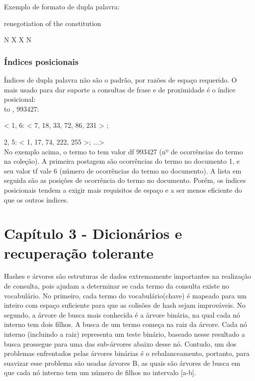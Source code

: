 Exemplo de formato de dupla palavra:

renegotiation of the constitution

N X X N

\subsubsection{Índices posicionais}

Índices de dupla palavra não são o padrão, por razões de espaço requerido. O mais usado para dar suporte a consultas de frase e de proximidade é o índice posicional: \\

to , 993427:

< 1, 6: < 7, 18, 33, 72, 86, 231 > ;

\hspace{0.4cm}2, 5: < 1, 17, 74, 222, 255 >; ...>\\

No exemplo acima, o termo to tem valor df 993427 (nº de ocorrências do termo na coleção). A primeira postagem são ocorrências do termo no documento 1, e seu valor tf vale 6 (número de ocorrências do termo no documento). A lista em seguida são as posições de ocorrência do termo no documento. Porém, os índices posicionais tendem a exigir mais requisitos de espaço e a ser menos eficiente do que os outros índices.

\section{Capítulo 3 - Dicionários e recuperação tolerante}
\label{sec:dicionarios}

  Hashes e árvores são estruturas de dados extremamente importantes na realização de consulta, pois ajudam a determinar se cada termo da consulta existe no vocabulário. No primeiro, cada termo do vocabulário(chave) é mapeado para um inteiro com espaço suficiente para que as colisões de hash sejam improváveis. No segundo, a árvore de busca mais conhecida é a árvore binária, na qual cada nó interno tem dois filhos. A busca de um termo começa na raiz da árvore. Cada nó interno (incluindo a raiz) representa um teste binário, baseado nesse resultado a busca prossegue para uma das sub-árvores abaixo desse nó. Contudo, um dos problemas enfrentados pelas árvores binárias é o rebalanceamento, portanto, para suavizar esse problema são usadas árvores B, as quais são árvores de busca em que cada nó interno tem um número de filhos no intervalo [a-b].
   
